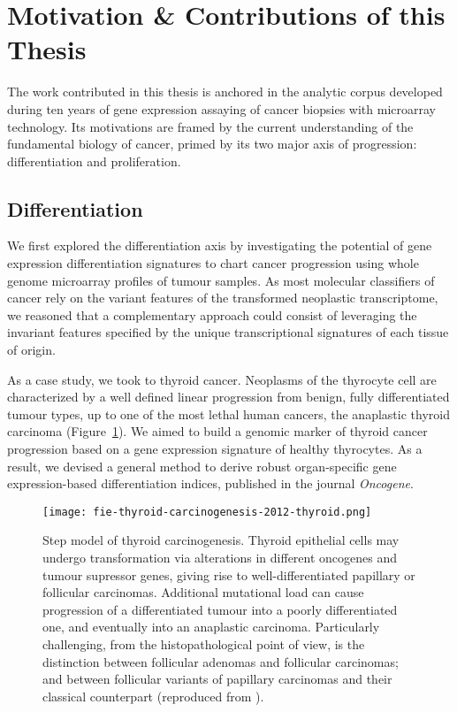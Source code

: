 \section{Motivation \& Contributions of this Thesis}

The work contributed in this thesis is anchored in the analytic corpus developed
during ten years of gene expression assaying of cancer biopsies with
microarray technology.  Its motivations are framed by the current understanding
of the fundamental biology of cancer, primed by its two major axis of
progression: differentiation and proliferation.

\subsection{Differentiation}
We first explored the differentiation axis by investigating the potential of
gene expression differentiation signatures to chart cancer progression using
whole genome microarray profiles of tumour samples.  As most molecular
classifiers of cancer rely on the variant features of the transformed neoplastic
transcriptome, we reasoned that a complementary approach could consist of
leveraging the invariant features specified by the unique transcriptional
signatures of each tissue of origin.

As a case study, we took to thyroid cancer.  Neoplasms of the thyrocyte cell are
characterized by a well defined linear progression from benign, fully
differentiated tumour types, up to one of the most lethal human cancers, the
anaplastic thyroid carcinoma (Figure~\ref{fig:thyroid-carcinogenesis}).  We
aimed to build a genomic marker of thyroid cancer progression based on a gene
expression signature of healthy thyrocytes.  As a result, we devised a general
method to derive robust \mbox{organ-specific} gene \mbox{expression-based}
differentiation indices, published in the journal
\emph{Oncogene}.\cite{tomas_general_2012}

\begin{figure}[ht]
  \texttt{[image: fie-thyroid-carcinogenesis-2012-thyroid.png]}%
  \caption[Step model of thyroid carcinogenesis]{Step model of thyroid
    carcinogenesis.  Thyroid epithelial cells may undergo transformation via
    alterations in different oncogenes and tumour supressor genes, giving rise
    to \mbox{well-differentiated} papillary or follicular carcinomas.
    Additional mutational load can cause progression of a differentiated tumour
    into a poorly differentiated one, and eventually into an anaplastic
    carcinoma.  Particularly challenging, from the histopathological point of
    view, is the distinction between follicular adenomas and follicular
    carcinomas; and between follicular variants of papillary carcinomas and
    their classical counterpart (reproduced from
    \citealp{sastre-perona_role_2012}).}
  \label{fig:thyroid-carcinogenesis}
\end{figure}

